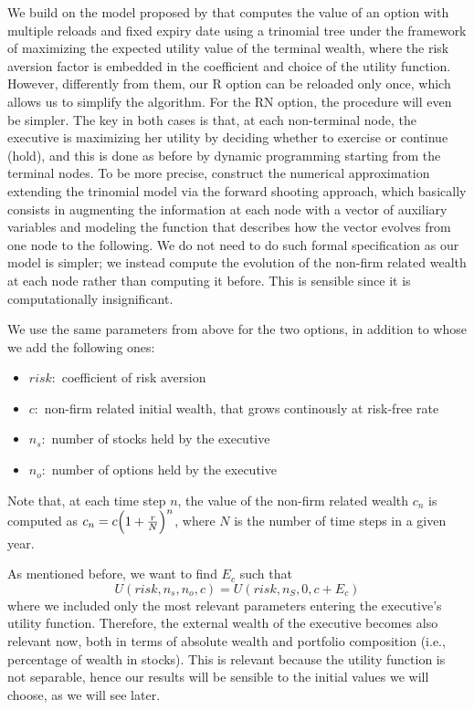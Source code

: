 We build on the model proposed by \cite{lau2005valuation} that computes the value of an option with multiple reloads and fixed expiry date using a trinomial tree under the framework of maximizing the expected utility value of the terminal wealth, where the risk aversion factor is embedded in the coefficient and choice of the utility function. However, differently from them, our R option can be reloaded only once, which allows us to simplify the algorithm. For the RN option, the procedure will even be simpler. The key in both cases is that, at each non-terminal node, the executive is maximizing her utility by deciding whether to exercise or continue (hold), and this is done as before by dynamic programming starting from the terminal nodes.
To be more precise, \cite{lau2005valuation} construct the numerical approximation extending the trinomial model via the forward shooting approach, which basically consists in augmenting the information at each node with a vector of auxiliary variables and modeling the function that describes how the vector evolves from one node to the following. We do not need to do such formal specification as our model is simpler; we instead compute the evolution of the non-firm related wealth at each node rather than computing it before. This is sensible since it is computationally insignificant.

We use the same parameters from above for the two options, in addition to whose we add the following ones: 
\begin{itemize}
    \item $risk: $ coefficient of risk aversion
    \item $c: $ non-firm related initial wealth, that grows continously at risk-free rate 
    \item $n_s: $ number of stocks held by the executive
    \item $n_o: $ number of options held by the executive
\end{itemize}
Note that, at each time step $n$, the value of the non-firm related wealth $c_n$ is computed as $c_n = c \Bigl(1+\frac{r}{N}\Bigr)^{n}$, where $N$ is the number of time steps in a given year.


As mentioned before, we want to find $E_c$ such that 
$$U(risk, n_s, n_o, c) = U(risk, n_S, 0, c + E_c) $$
where we included only the most relevant parameters entering the executive's utility function. Therefore, the external wealth of the executive becomes also relevant now, both in terms of absolute wealth and portfolio composition (i.e., percentage of wealth in stocks). This is relevant because the utility function is not separable, hence our results will be sensible to the initial values we will choose, as we will see later.

